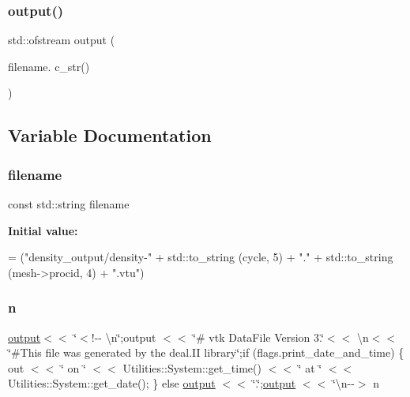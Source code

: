 \subsubsection{\texorpdfstring{output()}{output()}}
{\footnotesize\ttfamily std\+::ofstream output (\begin{DoxyParamCaption}\item[{filename.}]{c\+\_\+str() }\end{DoxyParamCaption})}



\subsection{Variable Documentation}
\mbox{\label{a00623_a42a21beb8018ac623f4d09db1343b9cf}} 
\subsubsection{\texorpdfstring{filename}{filename}}
{\footnotesize\ttfamily const std\+::string filename}

{\bfseries Initial value\+:}
\begin{DoxyCode}
= (\textcolor{stringliteral}{"density\_output/density-"} +
                  std::to\_string (cycle, 5) +
                  \textcolor{stringliteral}{"."} +
                  std::to\_string
                  (mesh->procid, 4) +
                  \textcolor{stringliteral}{".vtu"})
\end{DoxyCode}
\mbox{\label{a00623_a781a04ab095280f838ff3eb0e51312e0}} 
\subsubsection{\texorpdfstring{n}{n}}
{\footnotesize\ttfamily \hyperlink{a00623_a934120182a1459d17613528940e2bc61}{output}$<$$<$ \char`\"{}$<$!-\/-\/ \textbackslash{}n\char`\"{};output $<$$<$ \char`\"{}\# vtk Data\+File Version 3.\char`\"{}$<$$<$ \textquotesingle{}\textbackslash{}n\textquotesingle{}$<$$<$ \char`\"{}\#This file was generated by the deal.\+II library\char`\"{};if (flags.\+print\+\_\+date\+\_\+and\+\_\+time) \{ out $<$$<$ \char`\"{} on \char`\"{} $<$$<$ Utilities\+::\+System\+::get\+\_\+time() $<$$<$ \char`\"{} at \char`\"{} $<$$<$ Utilities\+::\+System\+::get\+\_\+date(); \} else \hyperlink{a00623_a934120182a1459d17613528940e2bc61}{output} $<$$<$ \char`\"{}.\char`\"{};\hyperlink{a00623_a934120182a1459d17613528940e2bc61}{output} $<$$<$ \char`\"{}\textbackslash{}n-\/-\/$>$ n}

